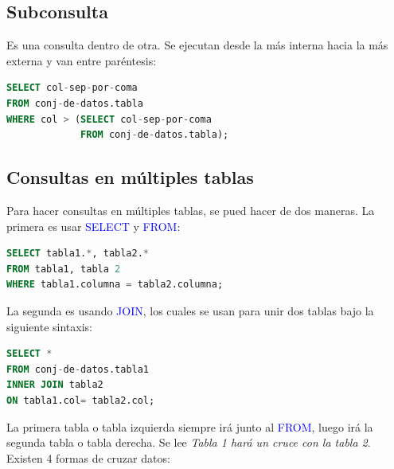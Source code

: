 \documentclass[a4paper, 12pt]{book}
\begin{document}
\subsection{Subconsulta}
Es una consulta dentro de otra. Se ejecutan desde la más interna hacia la más externa y van entre paréntesis:
\begin{lstlisting}[language=SQL]
SELECT col-sep-por-coma
FROM conj-de-datos.tabla
WHERE col > (SELECT col-sep-por-coma
             FROM conj-de-datos.tabla);
\end{lstlisting}
\subsection{Consultas en múltiples tablas}
Para hacer consultas en múltiples tablas, se pued hacer de dos maneras. La primera es usar \textcolor{blue}{SELECT} y \textcolor{blue}{FROM}:
\begin{lstlisting}[language=SQL]
SELECT tabla1.*, tabla2.*
FROM tabla1, tabla 2
WHERE tabla1.columna = tabla2.columna;
\end{lstlisting}
La segunda es usando \textcolor{blue}{JOIN}, los cuales se usan para unir dos tablas bajo la siguiente sintaxis:
\begin{lstlisting}[language=SQL]
SELECT *
FROM conj-de-datos.tabla1
INNER JOIN tabla2
ON tabla1.col= tabla2.col;
\end{lstlisting}
La primera tabla o tabla izquierda siempre irá junto al \textcolor{blue}{FROM}, luego irá la segunda tabla o tabla derecha. Se lee \textit{Tabla 1 hará un cruce con la tabla 2}. \\
Existen 4 formas de cruzar datos:
\end{document}
